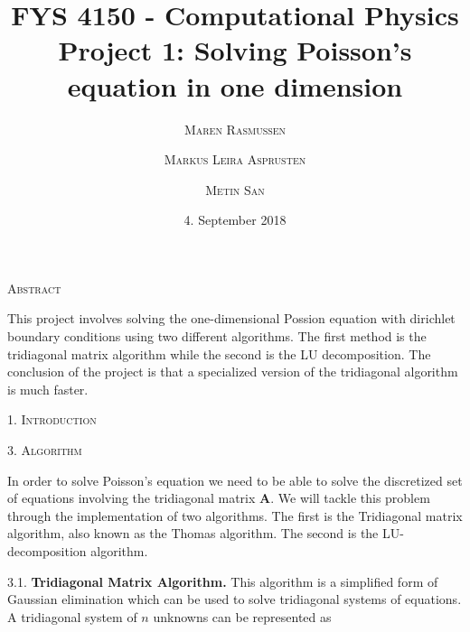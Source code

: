 \documentclass[a4paper,10pt]{article}
\title{FYS 4150 - Computational Physics\\
 Project 1: Solving Poisson's equation in one dimension 
}
\date{\normalsize{4. September 2018} }
\author{
 \textsc{\small{Maren Rasmussen}}\and \textsc{\small{Markus Leira Asprusten}}\and \textsc{\small{Metin San}}
 }
\begin{document}
\maketitle

\begin{center}
\textsc{Abstract}
\end{center}

\begin{adjustwidth}{7mm}{7mm}

This project involves solving the one-dimensional Possion equation with dirichlet boundary conditions using two different algorithms. The first method is the tridiagonal matrix algorithm while the second is the LU decomposition. The conclusion of the project is that a specialized version of the tridiagonal algorithm is much faster.

\end{adjustwidth}



\bigskip

\begin{center}
\textsc{1. Introduction}
\end{center}

\blindtext
\newpage


\begin{center}
\textsc{3. Algorithm}
\end{center}
In order to solve Poisson's equation we need to be able to solve the discretized set of equations involving the tridiagonal matrix $\textbf{A}$. We will tackle this problem through the implementation of two algorithms. The first is the Tridiagonal matrix algorithm, also known as the Thomas algorithm. The second is the LU-decomposition algorithm. 
\bigskip

3.1. \textbf{Tridiagonal Matrix Algorithm.} This algorithm is a simplified form of Gaussian elimination which can be used to solve tridiagonal systems of equations. A tridiagonal system of $n$ unknowns can be represented as 
\end{document}
